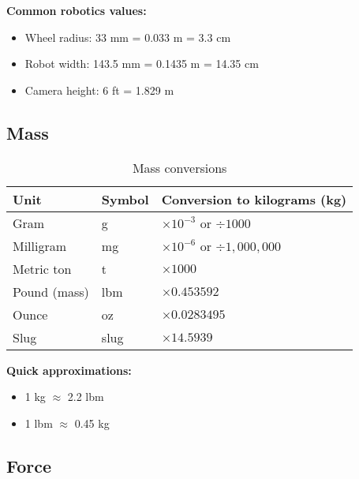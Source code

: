 \textbf{Common robotics values:}
\begin{itemize}
    \item Wheel radius: 33 mm = 0.033 m = 3.3 cm
    \item Robot width: 143.5 mm = 0.1435 m = 14.35 cm
    \item Camera height: 6 ft = 1.829 m
\end{itemize}

\subsection{Mass}

\begin{table}[H]
\centering
\begin{tabular}{|l|l|l|}
\hline
\rowcolor{blue!20}
\textbf{Unit} & \textbf{Symbol} & \textbf{Conversion to kilograms (kg)} \\
\hline
Gram & g & $\times 10^{-3}$ or $\div 1000$ \\
\hline
Milligram & mg & $\times 10^{-6}$ or $\div 1{,}000{,}000$ \\
\hline
Metric ton & t & $\times 1000$ \\
\hline
\rowcolor{yellow!20}
Pound (mass) & lbm & $\times 0.453592$ \\
\hline
\rowcolor{yellow!20}
Ounce & oz & $\times 0.0283495$ \\
\hline
\rowcolor{yellow!20}
Slug & slug & $\times 14.5939$ \\
\hline
\end{tabular}
\caption{Mass conversions}
\end{table}

\textbf{Quick approximations:}
\begin{itemize}
    \item 1 kg $\approx$ 2.2 lbm
    \item 1 lbm $\approx$ 0.45 kg
\end{itemize}

\subsection{Force}

